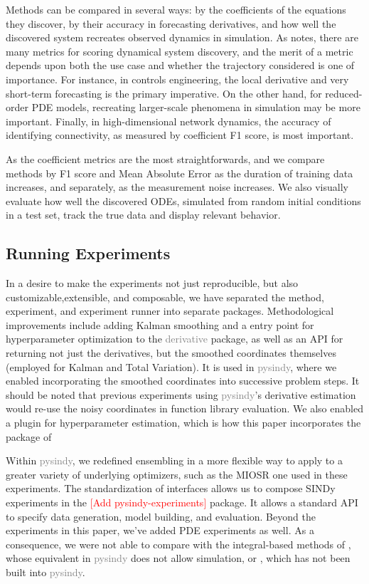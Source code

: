 \documentclass{article}
\newcommand{\red}[1]{\textcolor{red}{#1}}
\newcommand{\gray}[1]{\textcolor{gray}{#1}}
\begin{document}
Methods can be compared in several ways: by the coefficients of the equations they discover, by their accuracy in forecasting derivatives, and how well the discovered system recreates observed dynamics in simulation.  As \cite{Gilpin2023} notes, there are many metrics for scoring dynamical system discovery, and the merit of a metric depends upon both the use case and whether the trajectory considered is one of importance.  For instance, in controls engineering, the local derivative and very short-term forecasting is the primary imperative.  On the other hand, for reduced-order PDE models, recreating larger-scale phenomena in simulation may be more important.  Finally, in high-dimensional network dynamics, the accuracy of identifying connectivity, as measured by coefficient F1 score, is most important.

As the coefficient metrics are the most straightforwards, and we compare methods by F1 score and Mean Absolute Error as the duration of training data increases, and separately, as the measurement noise increases.  We also visually evaluate how well the discovered ODEs, simulated from random initial conditions in a test set, track the true data and display relevant behavior.

\subsection{Running Experiments}

In a desire to make the experiments not just reproducible, but also customizable,extensible, and composable, we have separated the method, experiment, and experiment runner into separate packages.  Methodological improvements include adding Kalman smoothing and a entry point for hyperparameter optimization to the \gray{derivative} package, as well as an API for returning not just the derivatives, but the smoothed coordinates themselves (employed for Kalman and Total Variation).  It is used in \gray{pysindy}, where we enabled incorporating the smoothed coordinates into successive problem steps.  It should be noted that previous experiments using \gray{pysindy}'s derivative estimation would re-use the noisy coordinates in function library evaluation.  We also enabled a plugin for hyperparameter estimation, which is how this paper incorporates the package of \cite{Barratt2020}

Within \gray{pysindy}, we redefined ensembling in a more flexible way to apply to a greater variety of underlying optimizers, such as the MIOSR one used in these experiments.  The standardization of interfaces allows us to compose SINDy experiments in the \red{[Add pysindy-experiments]} package.  It allows a standard API to specify data generation, model building, and evaluation.  Beyond the experiments in this paper, we've added PDE experiments as well.  As a consequence, we were not able to compare with the integral-based methods of \cite{messenger2021bweak}, whose equivalent in \gray{pysindy} does not allow simulation, or \cite{Hirsh2022}, which has not been built into \gray{pysindy}.
\end{document}
